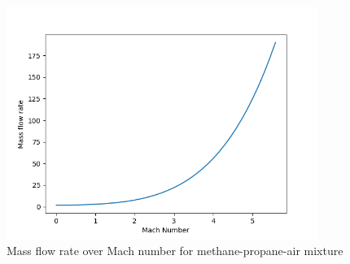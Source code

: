 \documentclass[a4paper,11pt]{article}
\begin{document}
	\begin{figure}[H]
		\centering
		\includegraphics[width=0.9\textwidth]{Metan(2mol)_propan(1mol)_pow/Mass_flow_rate_over_Mach.png}
       		\caption{Mass flow rate over Mach number for methane-propane-air mixture}
	\end{figure}
\end{document}
